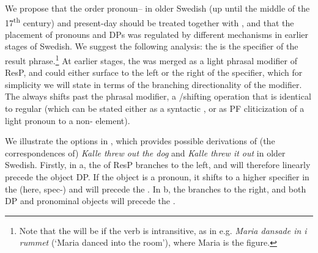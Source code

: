 \documentclass[output=paper]{langscibook}
\begin{document}
We propose that the order pronoun– in older Swedish (up until the middle of the 17\textsuperscript{th} century) and present-day  should be treated together with , and that the placement of pronouns and DPs was regulated by different mechanisms in earlier stages of Swedish. We suggest the following analysis: the  is the specifier of the result phrase.\footnote{Note that the  will be  if the verb is intransitive, as in e.g. \textit{Maria dansade in i rummet} (‘Maria danced into the room’), where Maria is the figure.} At earlier stages, the  was merged as a light phrasal modifier of ResP, and could either surface to the left or the right of the specifier, which for simplicity we will state in terms of the branching directionality of the modifier. The  always shifts past the phrasal modifier, a /shifting operation that is identical to regular  (which can be stated either as a syntactic , or as PF cliticization of a light pronoun to a non- element). 



We illustrate the options in , which provides possible derivations of (the correspondences of) \textit{Kalle threw out the dog} and \textit{Kalle threw it out} in older Swedish. Firstly, in a, the  of ResP branches to the left, and will therefore linearly precede the object DP. If the object is a pronoun, it shifts to a higher specifier in the  (here, spec-) and will precede the . In b, the  branches to the right, and both DP and pronominal objects will precede the .
\end{document}
